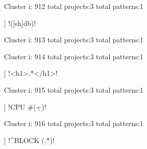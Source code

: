 Cluster i: 912
total projects:3
total patterns:1
\begin{multicols}{1}
\begin{description}[noitemsep,topsep=0pt]
\item [[3] ] \cverb!([sh]db)\s!
\end{description}
\end{multicols}







Cluster i: 913
total projects:3
total patterns:1
\begin{multicols}{1}
\end{multicols}







Cluster i: 914
total projects:3
total patterns:1
\begin{multicols}{1}
\begin{description}[noitemsep,topsep=0pt]
\item [[3] ] \cverb!<h1>.*</h1>!
\end{description}
\end{multicols}







Cluster i: 915
total projects:3
total patterns:1
\begin{multicols}{1}
\begin{description}[noitemsep,topsep=0pt]
\item [[3] ] \cverb!CPU #(\d+)!
\end{description}
\end{multicols}







Cluster i: 916
total projects:3
total patterns:1
\begin{multicols}{1}
\begin{description}[noitemsep,topsep=0pt]
\item [[3] ] \cverb!^BLOCK (.*)!
\end{description}
\end{multicols}







